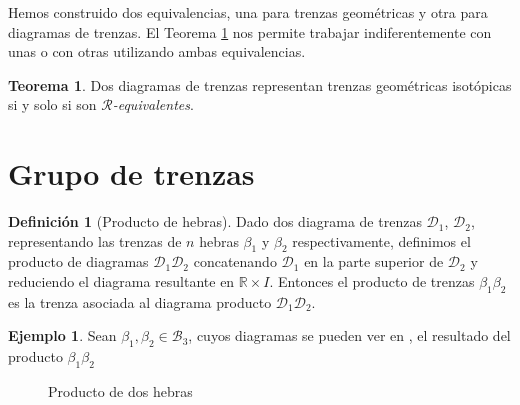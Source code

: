 \documentclass[12pt]{article}
\theoremstyle{definition}
\newtheorem{defi}{Definición}[section]
\newtheorem{teor}{Teorema}[section]
\newtheorem{ejem}{Ejemplo}[section]
\begin{document}
Hemos construido dos equivalencias, una para trenzas geométricas y otra para diagramas de trenzas. El Teorema \ref{teor:equiv} nos permite trabajar indiferentemente con unas o con otras utilizando ambas equivalencias.


\begin{teor}
Dos diagramas de trenzas representan trenzas geométricas isotópicas si y solo si son $\mathcal{R}$\textit{-equivalentes}.
\label{teor:equiv}
\end{teor}
\section{Grupo de trenzas}
\begin{defi}[Producto de hebras]
Dado dos diagrama de trenzas $\mathcal{D}_1$, $\mathcal{D}_2$, representando las trenzas de $n$ hebras $\beta_1$ y $\beta_2$ respectivamente, definimos el producto de diagramas $\mathcal{D}_1\mathcal{D}_2$ concatenando $\mathcal{D}_1$ en la parte superior de $\mathcal{D}_2$ y reduciendo el diagrama resultante en $\mathbb{R}\times I$. Entonces el producto de trenzas $\beta_1\beta_2$ es la trenza  asociada al diagrama producto $\mathcal{D}_1\mathcal{D}_2$.

\end{defi} 

\begin{ejem}
Sean $\beta_1,\beta_2\in \mathcal{B}_3$, cuyos diagramas se pueden ver en , el resultado del producto $\beta_1\beta_2$ 
\begin{figure}[h!]
\centering
	\begin{subfigure}[b]{0.45\linewidth}
		\begin{center}
		\end{center}
		
		\caption{}
		\label{subfig:factores}
	\end{subfigure}
	\begin{subfigure}[b]{0.45\linewidth}
		\begin{center}
		\end{center}
		\caption{}
	\end{subfigure}
	\caption{Producto de dos hebras}
	\label{fig:producto_hebras}
\end{figure}
\end{ejem}
\end{document}
